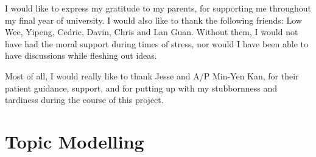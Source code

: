 \documentclass[hyp,12pt]{socreport}
\begin{document}
\begin{acknowledgement}
I would like to express my gratitude to my parents, for supporting me throughout 
my final year of university. I would also like to thank the following friends: 
Low Wee, Yipeng, Cedric, Davin, Chris and Lan Guan.  Without them, I would not 
have had the moral support during times of stress, nor would I have been able to 
have discussions while fleshing out ideas.

Most of all, I would really like to thank Jesse and A/P Min-Yen Kan, for their 
patient guidance, support, and for putting up with my stubbornness and tardiness 
during the course of this project.
\end{acknowledgement}

\listoffigures 
\listoftables
\tableofcontents 











\appendix
\chapter{Topic Modelling}\label{top_modeling}

\end{document}
